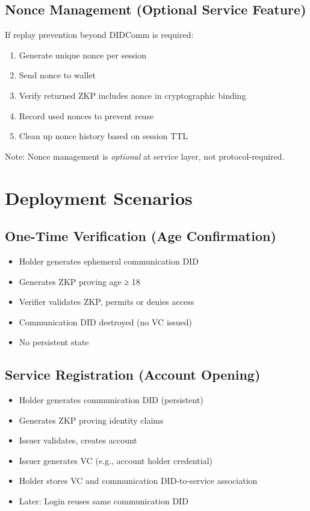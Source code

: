 \subsection{Nonce Management (Optional Service Feature)}

If replay prevention beyond DIDComm is required:

\begin{enumerate}
  \item Generate unique nonce per session
  \item Send nonce to wallet
  \item Verify returned ZKP includes nonce in cryptographic binding
  \item Record used nonces to prevent reuse
  \item Clean up nonce history based on session TTL
\end{enumerate}

Note: Nonce management is \emph{optional} at service layer, not protocol-required.

\section{Deployment Scenarios}

\subsection{One-Time Verification (Age Confirmation)}

\begin{itemize}
  \item Holder generates ephemeral communication DID
  \item Generates ZKP proving age ≥ 18
  \item Verifier validates ZKP, permits or denies access
  \item Communication DID destroyed (no VC issued)
  \item No persistent state
\end{itemize}

\subsection{Service Registration (Account Opening)}

\begin{itemize}
  \item Holder generates communication DID (persistent)
  \item Generates ZKP proving identity claims
  \item Issuer validates, creates account
  \item Issuer generates VC (e.g., account holder credential)
  \item Holder stores VC and communication DID-to-service association
  \item Later: Login reuses same communication DID
\end{itemize}

